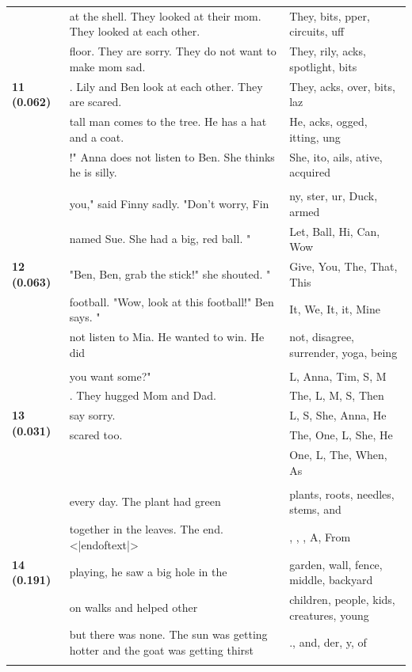 \documentclass{article}
\theoremstyle{plain}
\theoremstyle{definition}
\theoremstyle{remark}
\begin{document}
\begin{longtable}{|p{}|p{}|p{}|}
\multirow{5}{*}{\textbf{11 (0.062)}} & at the shell. They looked at their mom. They looked at each other. & They, bits, pper,  circuits, uff \\
& floor. They are sorry. They do not want to make mom sad. & They, rily, acks,  spotlight, bits \\
& .  Lily and Ben look at each other. They are scared. & They, acks, over, bits,  laz \\
& tall man comes to the tree. He has a hat and a coat. & He, acks, ogged, itting, ung \\
& !"  Anna does not listen to Ben. She thinks he is silly. & She, ito, ails, ative,  acquired \\
& & \\
\multirow{5}{*}{\textbf{12 (0.063)}} & you," said Finny sadly.  "Don't worry, Fin & ny, ster, ur,  Duck, armed \\
& named Sue. She had a big, red ball. " & Let, Ball, Hi, Can, Wow \\
& "Ben, Ben, grab the stick!" she shouted. " & Give, You, The, That, This \\
& football.  "Wow, look at this football!" Ben says. " & It, We,  It,  it, Mine \\
& not listen to Mia. He wanted to win. He did & not,  disagree,  surrender,  yoga,  being \\
& & \\
\multirow{5}{*}{\textbf{13 (0.031)}} & you want some?" & L, Anna, Tim, S, M \\
& . They hugged Mom and Dad. & The, L, M, S, Then \\
& say sorry. & L, S, She, Anna, He \\
& scared too. & The, One, L, She, He \\
&  & One, L, The, When, As \\
& & \\
\multirow{5}{*}{\textbf{14 (0.191)}} & every day. The plant had green & plants,  roots,  needles,  stems,  and \\
& together in the leaves. The end.<|endoftext|> & ,   ,  ,  A,  From \\
& playing, he saw a big hole in the & garden,  wall,  fence,  middle,  backyard \\
& on walks and helped other & children,  people,  kids,  creatures,  young \\
& but there was none. The sun was getting hotter and the goat was getting thirst & .,  and, der, y,  of \\
& & \\

\end{longtable}
\end{document}
